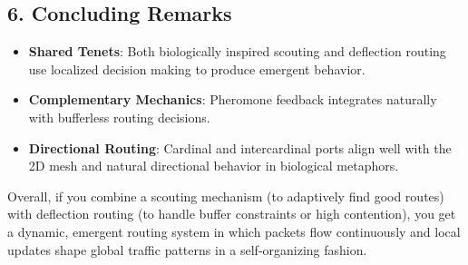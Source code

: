 \documentclass[../../../OAE-SPEC-MAIN.tex]{subfiles}
\begin{document}
\subsection*{6. Concluding Remarks}

\begin{itemize}
    \item \textbf{Shared Tenets}: Both biologically inspired scouting and deflection routing use localized decision making to produce emergent behavior.
    \item \textbf{Complementary Mechanics}: Pheromone feedback integrates naturally with bufferless routing decisions.
    \item \textbf{Directional Routing}: Cardinal and intercardinal ports align well with the 2D mesh and natural directional behavior in biological metaphors.
\end{itemize}


Overall, if you combine a scouting mechanism (to adaptively find good routes) with deflection routing (to handle buffer constraints or high contention), you get a dynamic, emergent routing system in which packets flow continuously and local updates shape global traffic patterns in a self-organizing fashion.
\end{document}
